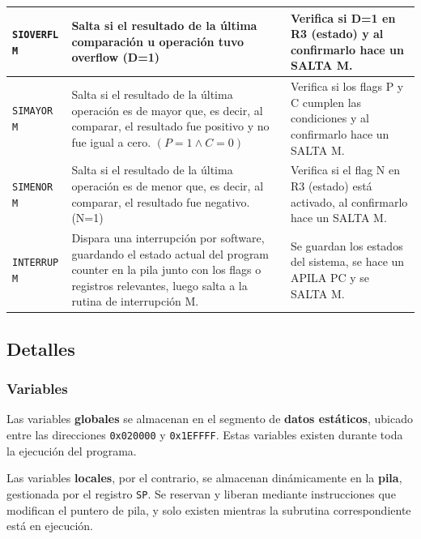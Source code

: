 \documentclass{article}
\begin{document}
\begin{longtable}{|p{}|p{}|p{}|}
  \hline
  \texttt{SIOVERFL M}         & Salta si el resultado de la última comparación u operación tuvo overflow (D=1)                                                                                                          & Verifica si D=1 en R3 (estado) y al confirmarlo hace un SALTA M.                      \\
  \hline
  \texttt{SIMAYOR M}          & Salta si el resultado de la última operación es de mayor que, es decir, al comparar, el resultado fue positivo y no fue igual a cero. $(P = 1 \land C = 0)$                             & Verifica si los flags P y C cumplen las condiciones y al confirmarlo hace un SALTA M. \\
  \hline
  \texttt{SIMENOR M}          & Salta si el resultado de la última operación es de menor que, es decir, al comparar, el resultado fue negativo. (N=1)                                                                   & Verifica si el flag N en R3 (estado) está activado, al confirmarlo hace un SALTA M.   \\
  \hline
  \texttt{INTERRUP M}         & Dispara una interrupción por software, guardando el estado actual del program counter en la pila junto con los flags o registros relevantes, luego salta a la rutina de interrupción M. & Se guardan los estados del sistema, se hace un APILA PC y se SALTA M.                 \\
  \hline
\end{longtable}



\subsection{Detalles}

\subsubsection{Variables}

Las variables \textbf{globales} se almacenan en el segmento de
\textbf{datos estáticos}, ubicado entre las direcciones
\texttt{0x020000} y \texttt{0x1EFFFF}. Estas variables
existen durante toda la ejecución del programa.

Las variables \textbf{locales}, por el contrario, se
almacenan dinámicamente en la \textbf{pila}, gestionada por
el registro \texttt{SP}. Se reservan y liberan mediante
instrucciones que modifican el puntero de pila,
y solo existen mientras la subrutina
correspondiente está en ejecución.
\end{document}
